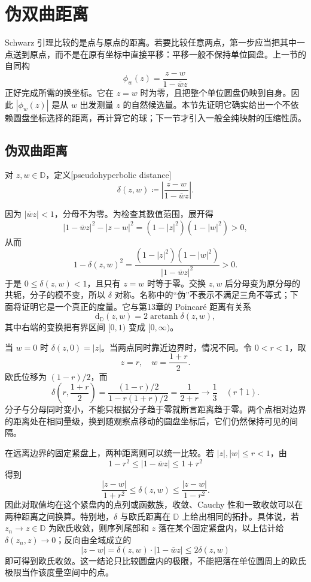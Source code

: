 \section{伪双曲距离}
\label{b3:sec:0602}

Schwarz 引理比较的是点与原点的距离。若要比较任意两点，第一步应当把其中一点送到原点，而不是在原有坐标中直接平移：平移一般不保持单位圆盘。上一节的自同构
\[
 \phi_w(z)=\frac{z-w}{1-\overline w z}
\]
正好完成所需的换坐标。它在 \(z=w\) 时为零，且把整个单位圆盘仍映到自身。因此 \(|\phi_w(z)|\) 是从 \(w\) 出发测量 \(z\) 的自然候选量。本节先证明它确实给出一个不依赖圆盘坐标选择的距离，再计算它的球；下一节才引入一般全纯映射的压缩性质。

\subsection{伪双曲距离}
\label{b3:subsec:060201}

\begin{definition}\label{b3:def:06-pseudohyperbolic}
对 \(z,w\in\mathbb D\)，定义[pseudohyperbolic distance]
\[
 \delta(z,w)\coloneqq\left|\frac{z-w}{1-\overline w z}\right|.
\]
\end{definition}
因为 \(|\overline w z|<1\)，分母不为零。为检查其数值范围，展开得
\[
 |1-\overline w z|^2-|z-w|^2
 =(1-|z|^2)(1-|w|^2)>0,
\]
从而
\[
 1-\delta(z,w)^2
 =\frac{(1-|z|^2)(1-|w|^2)}{|1-\overline w z|^2}>0.
\]
于是 \(0\le\delta(z,w)<1\)，且只有 \(z=w\) 时等于零。交换 \(z,w\) 后分母变为原分母的共轭，分子的模不变，所以 \(\delta\) 对称。名称中的“伪”不表示不满足三角不等式；下面将证明它是一个真正的度量。它与第13章的 Poincaré 距离有关系
\[
 \mathrm d_{\mathbb D}(z,w)=2\operatorname{arctanh}\delta(z,w),
\]
其中右端的变换把有界区间 \([0,1)\) 变成 \([0,\infty)\)。

\ProseParagraphBreak

当 \(w=0\) 时 \(\delta(z,0)=|z|\)。当两点同时靠近边界时，情况不同。令 \(0<r<1\)，取
\[
 z=r,\quad w=\frac{1+r}{2}.
\]
欧氏位移为 \((1-r)/2\)，而
\[
 \delta\left(r,\frac{1+r}{2}\right)
 =\frac{(1-r)/2}{1-r(1+r)/2}
 =\frac1{2+r}\longrightarrow\frac13
 \quad(r\uparrow1).
\]
分子与分母同时变小，不能只根据分子趋于零就断言距离趋于零。两个点相对边界的距离处在相同量级，换到随观察点移动的圆盘坐标后，它们仍然保持可见的间隔。

在远离边界的固定紧盘上，两种距离则可以统一比较。若 \(|z|,|w|\le r<1\)，由
\[
 1-r^2\le |1-\overline w z|\le1+r^2
\]
得到
\[
 \frac{|z-w|}{1+r^2}\le\delta(z,w)
 \le\frac{|z-w|}{1-r^2}.
\]
因此对取值均在这个紧盘内的点列或函数族，收敛、Cauchy 性和一致收敛可以在两种距离之间换算。特别地，\(\delta\) 与欧氏距离在 \(\mathbb D\) 上给出相同的拓扑。具体说，若 \(z_n\to z\in\mathbb D\) 为欧氏收敛，则序列尾部和 \(z\) 落在某个固定紧盘内，以上估计给 \(\delta(z_n,z)\to0\)；反向由全域成立的
\[
 |z-w|=\delta(z,w)\cdot|1-\overline w z|
 \le2\delta(z,w)
\]
即可得到欧氏收敛。这一结论只比较圆盘内的极限，不能把落在单位圆周上的欧氏极限当作该度量空间中的点。

